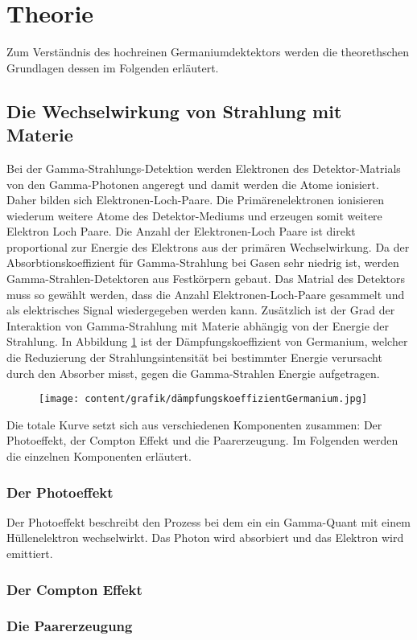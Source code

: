 \section[Theorie]{Theorie \textnormal{\cite{germanium}}}
\label{sec:theorie}

Zum Verständnis des hochreinen Germaniumdektektors werden die theorethschen Grundlagen dessen im Folgenden erläutert.

\subsection{Die Wechselwirkung von Strahlung mit Materie}
\label{sec:WW mit Materie}

Bei der Gamma-Strahlungs-Detektion werden Elektronen des Detektor-Matrials von den Gamma-Photonen angeregt und damit werden die 
Atome ionisiert. Daher bilden sich Elektronen-Loch-Paare. Die Primärenelektronen ionisieren wiederum weitere Atome des Detektor-Mediums und erzeugen somit weitere Elektron Loch Paare.
Die Anzahl der Elektronen-Loch Paare ist direkt proportional zur Energie des Elektrons aus der primären
Wechselwirkung. Da der Absorbtionskoeffizient für Gamma-Strahlung bei Gasen sehr niedrig ist, 
werden Gamma-Strahlen-Detektoren aus Festkörpern gebaut. Das Matrial des Detektors muss so gewählt werden, dass
die Anzahl Elektronen-Loch-Paare gesammelt und als elektrisches Signal wiedergegeben werden kann.
Zusätzlich ist der Grad der Interaktion von Gamma-Strahlung mit Materie abhängig von der Energie der Strahlung.
In Abbildung \ref{fig:koeffizient} ist der Dämpfungskoeffizient von Germanium, welcher die Reduzierung der Strahlungsintensität
bei bestimmter Energie verursacht durch den Absorber misst, gegen die Gamma-Strahlen Energie aufgetragen.

\begin{figure}[H]
    \centering
    \texttt{[image: content/grafik/dämpfungskoeffizientGermanium.jpg]}
    \caption{ \cite{gamma_ray}}
    \label{fig:koeffizient}
\end{figure}

Die totale Kurve setzt sich aus verschiedenen Komponenten zusammen: Der Photoeffekt, der Compton Effekt und die Paarerzeugung.
Im Folgenden werden die einzelnen Komponenten erläutert.

\subsubsection{Der Photoeffekt}
\label{sec:photoeffekt}

Der Photoeffekt beschreibt den Prozess bei dem ein ein Gamma-Quant mit einem Hüllenelektron wechselwirkt.
Das Photon wird absorbiert und das Elektron wird emittiert.

\subsubsection{Der Compton Effekt}
\label{sec:compton}

\subsubsection{Die Paarerzeugung}
\label{paarerzeugung}